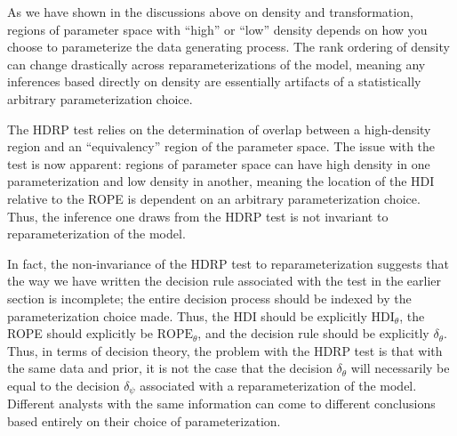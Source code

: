 \documentclass[man]{apa}
\newcommand{\hdr}{HDRP}
\begin{document}
As we have shown in the discussions above on density and transformation, regions of parameter space with ``high'' or ``low'' density depends on how you choose to parameterize the data generating process. The rank ordering of density can change drastically across reparameterizations of the model, meaning any inferences based directly on density are essentially artifacts of a statistically arbitrary parameterization choice. 

The \hdr{} test relies on the determination of overlap between a high-density region and an ``equivalency'' region of the parameter space. The issue with the test is now apparent: regions of parameter space can have high density in one parameterization and low density in another, meaning the location of the HDI relative to the ROPE is dependent on an arbitrary parameterization choice.  Thus, the inference one draws from the \hdr{} test is not invariant to reparameterization of the model. 

In fact, the non-invariance of the \hdr{} test to reparameterization suggests that the way we have written the decision rule associated with the test in the earlier section is incomplete; the entire decision process should be indexed by the parameterization choice made. Thus, the HDI should be explicitly $\text{HDI}_\theta$, the ROPE should explicitly be $\text{ROPE}_\theta$, and the decision rule should be explicitly $\delta_\theta$. Thus, in terms of decision theory, the problem with the \hdr{} test is that with the same data and prior, it is not the case that the decision $\delta_\theta$ will necessarily be equal to the decision $\delta_\psi$ associated with a reparameterization of the model. Different analysts with the same information can come to different conclusions based entirely on their choice of parameterization.








\end{document}
